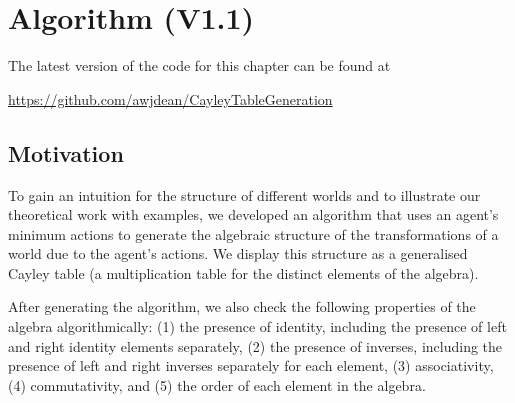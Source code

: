 \chapter{
Algorithm 
(V1.1)
}

The latest version of the code for this chapter can be found at
\begin{center}
\url{https://github.com/awjdean/CayleyTableGeneration}
\end{center}

\section{Motivation}

To gain an intuition for the structure of different worlds and to illustrate our theoretical work with examples, we developed an algorithm that uses an agent’s minimum actions to generate the algebraic structure of the transformations of a world due to the agent's actions.
We display this structure as a generalised Cayley table (a multiplication table for the distinct elements of the algebra).

After generating the algorithm, we also check the following properties of the algebra algorithmically: (1) the presence of identity, including the presence of left and right identity elements separately, (2) the presence of inverses, including the presence of left and right inverses separately for each element, (3) associativity, (4) commutativity, and (5) the order of each element in the algebra.

